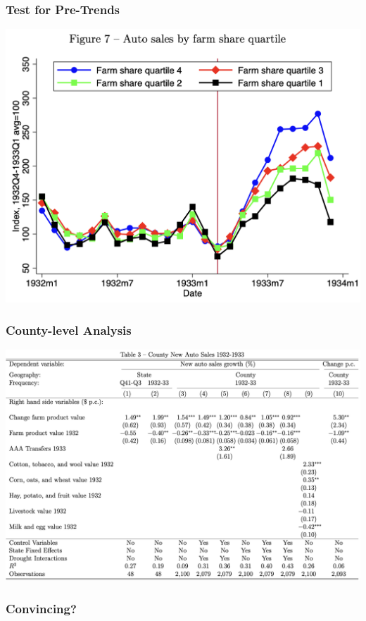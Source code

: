 \documentclass[english,xcolor=svgnames]{beamer}
\begin{document}
\begin{frame}
\frametitle[alignment=center]{Test for Pre-Trends}
\centering
\includegraphics[scale=0.5]{figures/HRWFIG7.png}
\end{frame}

\begin{frame}
\frametitle[alignment=center]{County-level Analysis}
\centering
\includegraphics[scale=0.35]{figures/HRWTAB3.png}
\end{frame}

\begin{frame}
\frametitle[alignment=center]{Convincing?}

\end{frame}
\end{document}
